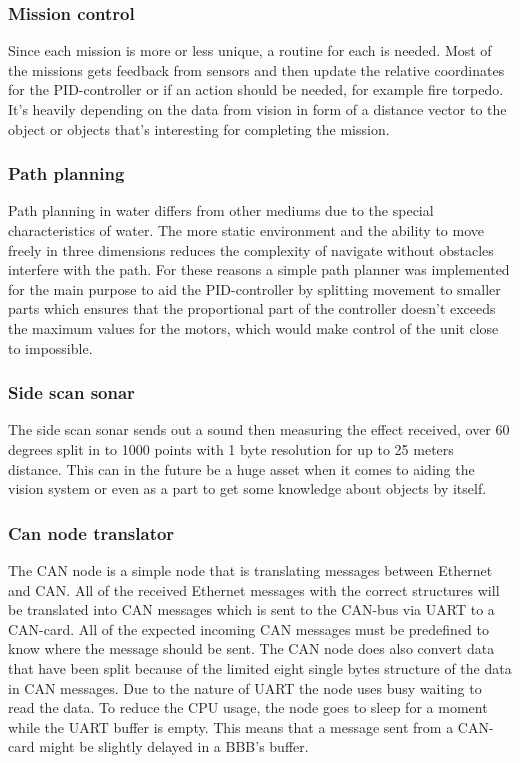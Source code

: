  
		\subsubsection{Mission control} %
		\noindent Since each mission is more or less unique, a routine for each is needed.
		Most of the missions gets feedback from sensors and then update the relative coordinates for the PID-controller or if an action should be needed, for example fire torpedo.
		It's heavily depending on the data from vision in form of a distance vector to the object or objects that's interesting for completing the mission.
		
		\subsubsection{Path planning} %
		\noindent Path planning in water differs from other mediums due to the special characteristics of water. The more static environment and the ability to move freely in three dimensions reduces the complexity of navigate without obstacles interfere with the path. For these reasons a simple path planner was implemented for the main purpose to aid the PID-controller by splitting movement to smaller parts which ensures that the proportional part of the controller doesn't exceeds the maximum values for the motors, which would make control of the unit close to impossible. 
		
				\subsubsection{Side scan sonar} %
		\noindent The side scan sonar \cite{side_scan_sonar} sends out a sound then measuring the effect received, over 60 degrees split in to 1000 points with 1 byte resolution for up to 25 meters distance. This can in the future be a huge asset when it comes to aiding the vision system or even as a part to get some knowledge about objects by itself.


\subsubsection{Can node translator} %
\noindent The CAN node is a simple node that is translating messages between Ethernet and CAN. All of the received Ethernet messages with the correct structures will be translated into CAN messages which is sent to the CAN-bus via UART to a CAN-card. All of the expected incoming CAN messages must be predefined to know where the message should be sent. The CAN node does also convert data that have been split because of the limited eight single bytes structure of the data in CAN messages. Due to the nature of UART the node uses busy waiting to read the data. To reduce the CPU usage, the node goes to sleep for a moment while the UART buffer is empty. This means that a message sent from a CAN-card might be slightly delayed in a BBB's buffer.


